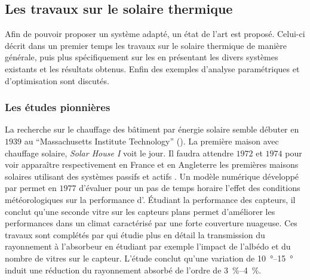 \subsection{Les travaux sur le solaire thermique} %
\label{sub:les_travaux_sur_le_solaire_thermique}
Afin de pouvoir proposer un système adapté, un état de l’art est proposé. Celui-ci
décrit dans un premier temps les travaux sur le solaire thermique de manière générale, puis
plus spécifiquement sur les  en présentant les divers systèmes existants
et les résultats obtenus. Enfin des exemples d’analyse paramétriques et d’optimisation
sont discutés.

\subsubsection{Les études pionnières} %
\label{ssub:les_etudes_pionnieres}
La recherche sur le chauffage des bâtiment par énergie solaire semble débuter en $1939$ au
\enquote{Massachusetts Institute Technology} (). La première maison avec
chauffage solaire, 
{\textit{Solar House I}} voit le jour. Il faudra attendre $1972$ et $1974$ pour voir apparaître respectivement
en France et en Angleterre les premières maisons solaires utilisant des systèmes passifs
et actifs \parencite{Michaelides1993}. Un modèle numérique développé par \textcite{Hunn197733}
permet en $1977$ d’évaluer pour un pas de temps horaire l’effet des conditions
météorologiques sur la performance d’. Étudiant la performance des capteurs, il
conclut qu’une seconde vitre sur les capteurs plans permet d’améliorer les performances
dans un climat caractérisé par une forte couverture nuageuse. Ces travaux sont complétés
par \textcite{Elsayed198989} qui étudie plus en détail la transmission du rayonnement à
l’absorbeur en étudiant par exemple l’impact de l’albédo et du nombre de vitres sur le
capteur. L’étude conclut qu’une variation de \SIrange{10}{15}{\degree} induit une
réduction du rayonnement absorbé de l’ordre de \SIrange{3}{4}{\percent}.

